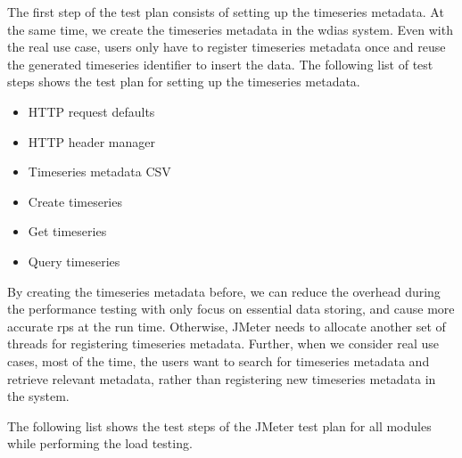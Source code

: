 The first step of the test plan consists of setting up the timeseries metadata. At the same time, we create the timeseries metadata in the \acrshort{wdias} system. Even with the real use case, users only have to register timeseries metadata once and reuse the generated timeseries identifier to insert the data. The following list of test steps shows the test plan for setting up the timeseries metadata.

\begin{itemize}
    \item HTTP request defaults
    \item HTTP header manager
    \item Timeseries metadata CSV
    \item Create timeseries
    \item Get timeseries
    \item Query timeseries
\end{itemize}

By creating the timeseries metadata before, we can reduce the overhead during the performance testing with only focus on essential data storing, and cause more accurate \acrshort{rps} at the run time. Otherwise, JMeter needs to allocate another set of threads for registering timeseries metadata. Further, when we consider real use cases, most of the time, the users want to search for timeseries metadata and retrieve relevant metadata, rather than registering new timeseries metadata in the system.

The following list shows the test steps of the JMeter test plan for all modules while performing the load testing.

